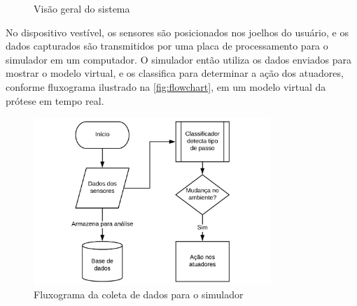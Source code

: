 \begin{figure}[ht]
    \centering
    \caption{Visão geral do sistema}
    \label{fig:big_picture}
    \hspace{1cm}
\end{figure}

No dispositivo vestível, os sensores são posicionados nos joelhos do usuário, e os dados capturados são transmitidos por uma placa de processamento para o simulador em um computador. 
O simulador então utiliza os dados enviados para mostrar o modelo virtual, e os classifica para determinar a ação dos atuadores, conforme fluxograma ilustrado na \autoref{fig:flowchart}, em um modelo virtual da prótese em tempo real.

\begin{figure}[ht]
	\caption{\label{fig:flowchart}Fluxograma da coleta de dados para o simulador}
	\begin{center}
	    \includegraphics[width=0.8\textwidth]{resources/flowchart}
	\end{center}
\end{figure}



